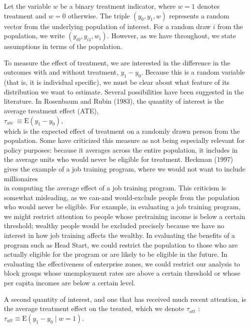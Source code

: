 \documentclass[10pt]{article}
\begin{document}
Let the variable $w$ be a binary treatment indicator, where $w=1$ denotes treatment and $w=0$ otherwise. The triple $\left(y_{0}, y_{1}, w\right)$ represents a random vector from the underlying population of interest. For a random draw $i$ from the population, we write $\left(y_{i 0}, y_{i 1}, w_{i}\right)$. However, as we have throughout, we state assumptions in terms of the population.

To measure the effect of treatment, we are interested in the difference in the outcomes with and without treatment, $y_{1}-y_{0}$. Because this is a random variable (that is, it is individual specific), we must be clear about what feature of its distribution we want to estimate. Several possibilities have been suggested in the literature. In Rosenbaum and Rubin (1983), the quantity of interest is the average treatment effect (ATE),\\
$\tau_{\text {ate }} \equiv \mathrm{E}\left(y_{1}-y_{0}\right)$,\\
which is the expected effect of treatment on a randomly drawn person from the population. Some have criticized this measure as not being especially relevant for policy purposes: because it averages across the entire population, it includes in the average units who would never be eligible for treatment. Heckman (1997) gives the example of a job training program, where we would not want to include millionaires\\
in computing the average effect of a job training program. This criticism is somewhat misleading, as we can-and would-exclude people from the population who would never be eligible. For example, in evaluating a job training program, we might restrict attention to people whose pretraining income is below a certain threshold; wealthy people would be excluded precisely because we have no interest in how job training affects the wealthy. In evaluating the benefits of a program such as Head Start, we could restrict the population to those who are actually eligible for the program or are likely to be eligible in the future. In evaluating the effectiveness of enterprise zones, we could restrict our analysis to block groups whose unemployment rates are above a certain threshold or whose per capita incomes are below a certain level.

A second quantity of interest, and one that has received much recent attention, is the average treatment effect on the treated, which we denote $\tau_{a t t}$ :\\
$\tau_{a t t} \equiv \mathrm{E}\left(y_{1}-y_{0} \mid w=1\right)$.
\end{document}
